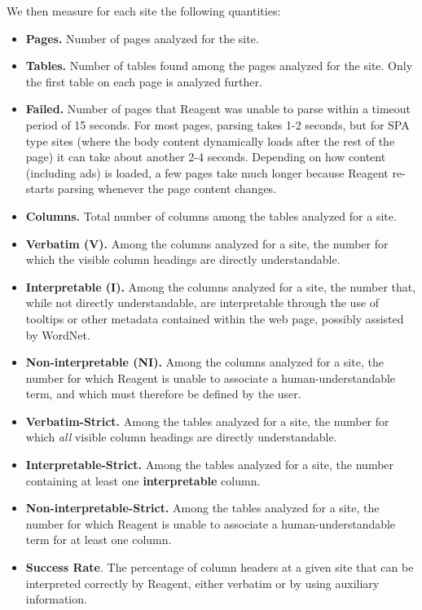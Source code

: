 We then measure for each site the following quantities:
\begin{itemize}
    \item {\bf Pages.} Number of pages analyzed for the site.
    \item {\bf Tables.} Number of tables found among the pages analyzed for the site. Only the first table on each page is analyzed further.
    \item {\bf Failed.} Number of pages that Reagent was unable to parse within a timeout period of 15 seconds. For most pages, parsing takes 1-2 seconds, but for SPA type sites (where the body content dynamically loads after the rest of the page) it can take about another 2-4 seconds. Depending on how content (including ads) is loaded, a few pages take much longer because Reagent re-starts parsing whenever the page content changes.
    \item {\bf Columns.} Total number of columns among the tables analyzed for a site.
    \item {\bf Verbatim (V).} Among the columns analyzed for a site, the number for which the visible column headings are directly understandable.
    \item {\bf Interpretable (I).} Among the columns analyzed for a site, the number that, while not directly understandable, are interpretable through the use of tooltips or other metadata contained within the web page, possibly assisted by WordNet.
    \item {\bf Non-interpretable (NI).} Among the columns analyzed for a site, the number for which Reagent is unable to associate a human-understandable term, and which must therefore be defined by the user.
    \item {\bf Verbatim-Strict.} Among the tables analyzed for a site, the number for which {\em all} visible column headings are directly understandable.
    \item {\bf Interpretable-Strict.} Among the tables analyzed for a site, the number containing at least one {\bf interpretable} column.
    \item {\bf Non-interpretable-Strict.} Among the tables analyzed for a site, the number for which Reagent is unable to associate a human-understandable term for at least one column.
    \item {\bf Success Rate}. The percentage of column headers at a given site that can be interpreted correctly by Reagent, either verbatim or by using auxiliary information.
\end{itemize}

